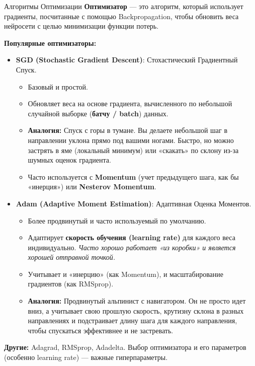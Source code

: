 \begin{myblock}{Алгоритмы Оптимизации}
    \textbf{Оптимизатор} — это алгоритм, который использует градиенты, посчитанные с помощью Backpropagation, чтобы обновить веса нейросети с целью минимизации функции потерь.

    \textbf{Популярные оптимизаторы:}
    \begin{itemize}
        \item \textbf{SGD (Stochastic Gradient Descent)}: Стохастический Градиентный Спуск.
            \begin{itemize}
                \item Базовый и простой.
                \item Обновляет веса на основе градиента, вычисленного по небольшой случайной выборке (\textbf{батчу / batch}) данных.
                \item \textbf{Аналогия:} Спуск с горы в тумане. Вы делаете небольшой шаг в направлении уклона прямо под вашими ногами. Быстро, но можно застрять в яме (локальный минимум) или «скакать» по склону из-за шумных оценок градиента.
                \item Часто используется с \textbf{Momentum} (учет предыдущего шага, как бы «инерция») или \textbf{Nesterov Momentum}.
            \end{itemize}
        \item \textbf{Adam (Adaptive Moment Estimation)}: Адаптивная Оценка Моментов.
            \begin{itemize}
                \item Более продвинутый и часто используемый по умолчанию.
                \item Адаптирует \textbf{скорость обучения (learning rate)} для каждого веса индивидуально. \textit{Часто хорошо работает «из коробки» и является хорошей отправной точкой.}
                \item Учитывает и «инерцию» (как Momentum), и масштабирование градиентов (как RMSprop).
                \item \textbf{Аналогия:} Продвинутый альпинист с навигатором. Он не просто идет вниз, а учитывает свою прошлую скорость, крутизну склона в разных направлениях и подстраивает длину шага для каждого направления, чтобы спускаться эффективнее и не застревать.
            \end{itemize}
    \end{itemize}
    \textbf{Другие:} Adagrad, RMSprop, Adadelta. Выбор оптимизатора и его параметров (особенно learning rate) — важные гиперпараметры.
\end{myblock}

